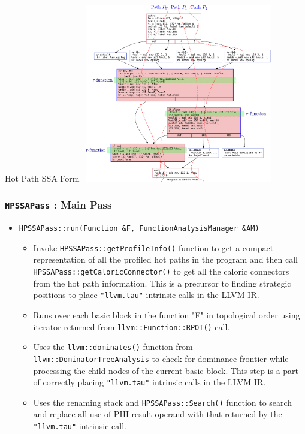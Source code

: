 \documentclass[aspectratio=169, compress]{beamer}
\begin{document}
\begin{frame}{Hot Path SSA Form}
	\centering
	\includegraphics[width=8.5cm,height=7.8cm]{afterHPSSA.pdf}
\end{frame}

\begin{frame}
	\frametitle{\texttt{HPSSAPass} : Main Pass}
	\begin{itemize}
		\item \texttt{HPSSAPass::run(Function &F, FunctionAnalysisManager &AM)} 
		\begin{itemize}
			\footnotesize
			\item Invoke \texttt{HPSSAPass::getProfileInfo()} function to get a compact representation of all the profiled \color{red} hot paths \color{black} in the program and then call \texttt{HPSSAPass::getCaloricConnector()} to get all the caloric connectors from the \color{red} hot path \color{black} information. This is a precursor to finding strategic positions to place \texttt{"llvm.tau"} intrinsic calls in the LLVM IR.
			\item Runs over each basic block in the function "F" in topological order using iterator returned from \texttt{llvm::Function::RPOT()} call.
			\item Uses the \texttt{llvm::dominates()} function from \texttt{llvm::DominatorTreeAnalysis} to check for dominance frontier while processing the child nodes of the current basic block. This step is a part of correctly placing \texttt{"llvm.tau"} intrinsic calls in the LLVM IR. 
			\item Uses the renaming stack and \texttt{HPSSAPass::Search()} function to search and replace all use of PHI result operand with that returned by the \texttt{"llvm.tau"} intrinsic call.
		\end{itemize}
	\end{itemize}
\end{frame}
\end{document}
